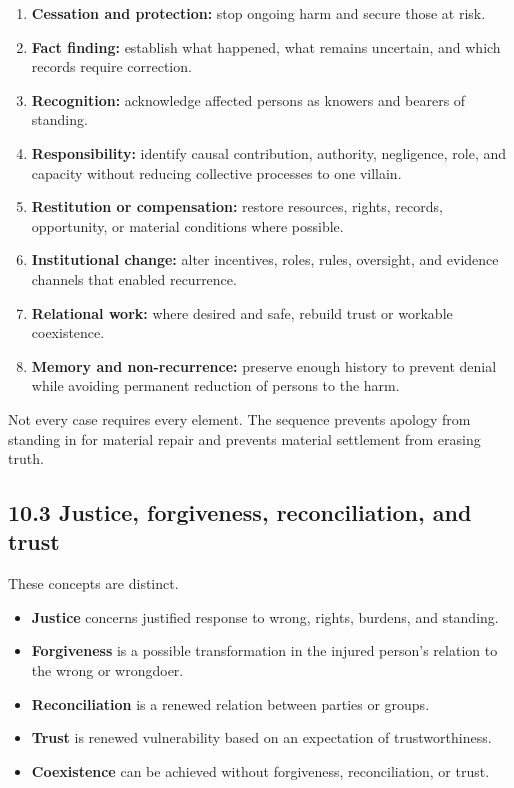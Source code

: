 \documentclass[
  11pt,
]{article}
\providecommand{\tightlist}{%
  \setlength{\itemsep}{0pt}\setlength{\parskip}{0pt}}
\begin{document}
\begin{enumerate}
\def\labelenumi{\arabic{enumi}.}
\tightlist
\item
  \textbf{Cessation and protection:} stop ongoing harm and secure those
  at risk.
\item
  \textbf{Fact finding:} establish what happened, what remains
  uncertain, and which records require correction.
\item
  \textbf{Recognition:} acknowledge affected persons as knowers and
  bearers of standing.
\item
  \textbf{Responsibility:} identify causal contribution, authority,
  negligence, role, and capacity without reducing collective processes
  to one villain.
\item
  \textbf{Restitution or compensation:} restore resources, rights,
  records, opportunity, or material conditions where possible.
\item
  \textbf{Institutional change:} alter incentives, roles, rules,
  oversight, and evidence channels that enabled recurrence.
\item
  \textbf{Relational work:} where desired and safe, rebuild trust or
  workable coexistence.
\item
  \textbf{Memory and non-recurrence:} preserve enough history to prevent
  denial while avoiding permanent reduction of persons to the harm.
\end{enumerate}

Not every case requires every element. The sequence prevents apology
from standing in for material repair and prevents material settlement
from erasing truth.

\subsection{10.3 Justice, forgiveness, reconciliation, and
trust}\label{justice-forgiveness-reconciliation-and-trust}

These concepts are distinct.

\begin{itemize}
\tightlist
\item
  \textbf{Justice} concerns justified response to wrong, rights,
  burdens, and standing.
\item
  \textbf{Forgiveness} is a possible transformation in the injured
  person's relation to the wrong or wrongdoer.
\item
  \textbf{Reconciliation} is a renewed relation between parties or
  groups.
\item
  \textbf{Trust} is renewed vulnerability based on an expectation of
  trustworthiness.
\item
  \textbf{Coexistence} can be achieved without forgiveness,
  reconciliation, or trust.
\end{itemize}
\end{document}
